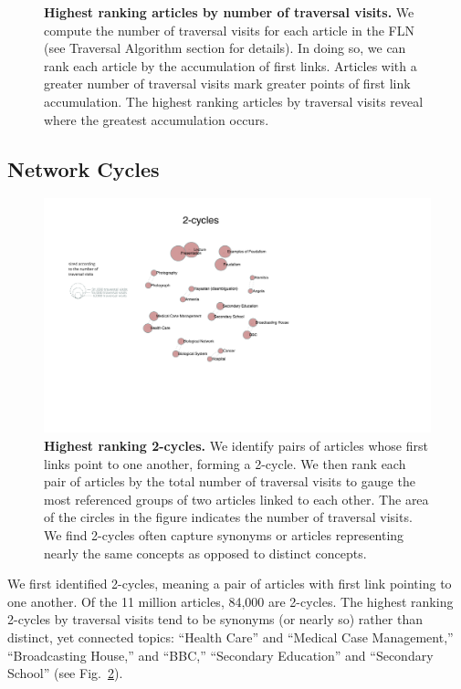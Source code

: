 \documentclass[pre,twocolumn,twoside,superscriptaddress,floatfix, aps, 10pt]{revtex4-1}
\begin{document}
\begin{figure}[tp!]
  \caption{
    \textbf{Highest ranking articles by number of traversal visits.}
We compute the number of traversal visits for each article in the FLN (see 
Traversal Algorithm section for details). In doing so, we can rank each article
by the accumulation of first links. Articles with a greater number of traversal visits
mark greater points of first link accumulation. The highest ranking articles by traversal visits reveal where the greatest accumulation occurs.}
  \label{fig:highest visits}
\end{figure}



\subsection{Network Cycles}

\begin{figure}[tp!]
  \includegraphics[width=\textwidth]{graphics/2_cycles.pdf}
  \caption{
    \textbf{Highest ranking 2-cycles.}
We identify pairs of articles whose first links point to one another, forming
a 2-cycle. We then rank each pair of articles by the total number of 
traversal visits to gauge the most referenced groups of two articles linked
to each other. The area of the circles in the figure indicates the number of traversal visits. We find 2-cycles often capture synonyms or articles representing nearly the 
same concepts as opposed to distinct concepts.}
  \label{fig:2-cycles}
\end{figure}
We first identified 2-cycles, meaning a pair of articles with first link pointing to one another.
Of the 11 million articles, 84,000 are 2-cycles. 
The highest ranking 2-cycles by traversal visits tend to be synonyms (or nearly so) rather than distinct, yet connected topics:
``Health Care'' and ``Medical Case Management,'' ``Broadcasting House,'' and ``BBC,'' ``Secondary Education'' and ``Secondary School'' 
(see Fig.~\ref{fig:2-cycles}).
\end{document}
